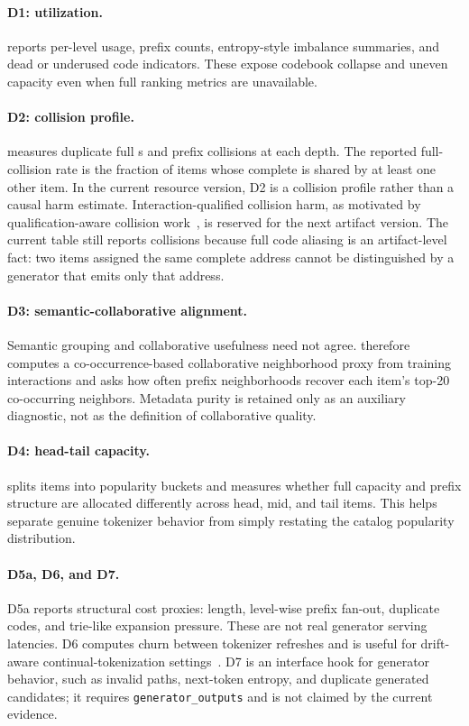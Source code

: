 \paragraph{D1: utilization.}
\tool reports per-level usage, prefix counts, entropy-style imbalance
summaries, and dead or underused code indicators. These expose codebook
collapse and uneven capacity even when full ranking metrics are unavailable.

\paragraph{D2: collision profile.}
\tool measures duplicate full \sid{}s and prefix collisions at each depth. The
reported full-collision rate is the fraction of items whose complete \sid is
shared by at least one other item. In the current resource version, D2 is a
collision profile rather than a causal harm estimate. Interaction-qualified
collision harm, as motivated by qualification-aware collision
work~\cite{hu2026quasid}, is reserved for the next artifact version. The
current table still reports collisions because full code aliasing is an
artifact-level fact: two items assigned the same complete address cannot be
distinguished by a generator that emits only that address.

\paragraph{D3: semantic-collaborative alignment.}
Semantic grouping and collaborative usefulness need not agree. \tool therefore
computes a co-occurrence-based collaborative neighborhood proxy from training
interactions and asks how often prefix neighborhoods recover each item's top-20
co-occurring neighbors. Metadata purity is retained only as an auxiliary
diagnostic, not as the definition of collaborative quality.

\paragraph{D4: head-tail capacity.}
\tool splits items into popularity buckets and measures whether full \sid
capacity and prefix structure are allocated differently across head, mid, and
tail items. This helps separate genuine tokenizer behavior from simply
restating the catalog popularity distribution.

\paragraph{D5a, D6, and D7.}
D5a reports structural cost proxies: \sid length, level-wise prefix fan-out,
duplicate codes, and trie-like expansion pressure. These are not real generator
serving latencies. D6 computes churn between tokenizer refreshes and is useful for
drift-aware continual-tokenization settings~\cite{feng2026dact}. D7 is an
interface hook for generator behavior, such as invalid paths, next-token
entropy, and duplicate generated candidates; it requires
\texttt{generator\_outputs} and is not claimed by the current evidence.

